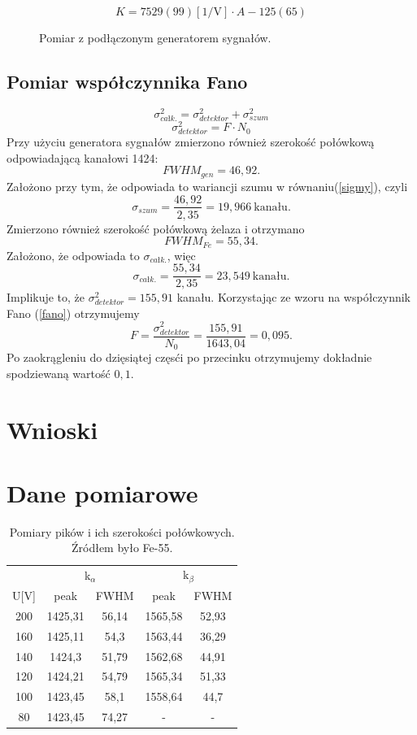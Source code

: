 \documentclass[11pt,a4paper]{article}
\begin{document}
\begin{equation}
	K = 7529(99)[\text{1/V}] \cdot A -125(65)
	\label{fit_gen}
\end{equation}
\begin{figure}[H]
\centering
\resizebox{.8\linewidth}{!}{}
\caption{Pomiar z podłączonym generatorem sygnałów.}
\label{fig1}
\end{figure}

\subsection{Pomiar współczynnika Fano}
\begin{equation}
	\sigma_{całk.}^2 = \sigma_{detektor}^2 + \sigma_{szum}^2
	\label{sigmy}
\end{equation}
\begin{equation}
	\sigma_{detektor}^2 = F\cdot N_0
	\label{fano}
\end{equation}
Przy użyciu generatora sygnałów zmierzono również szerokość połówkową odpowiadającą kanałowi 1424:
$$FWHM_{gen} = 46,92.$$
Założono przy tym, że odpowiada to wariancji szumu w równaniu(\ref{sigmy}), czyli
$$\sigma_{szum} = \frac{46,92}{2,35} = 19,966~ \text{kanału}. $$
Zmierzono również szerokość połówkową żelaza i otrzymano
$$FWHM_{Fe} = 55,34.$$
Założono, że odpowiada to $\sigma_{całk.}$, więc
$$\sigma_{całk.} = \frac{55,34}{2,35} = 23,549~ \text{kanału}.$$
Implikuje to, że $\sigma_{detektor}^2 = 155,91$ kanału.
Korzystając ze wzoru na współczynnik Fano (\ref{fano}) otrzymujemy
$$ F = \frac{\sigma_{detektor}^2}{N_0} = \frac{155,91}{1643,04} = 0,095.$$
Po zaokrągleniu do dzięsiątej częsći po przecinku otrzymujemy dokładnie spodziewaną wartość $0,1$.
\section{Wnioski}

\section{Dane pomiarowe}

\begin{longtable}{c|cc|cc}
	\caption{Pomiary pików i ich szerokości połówkowych. Źródłem było Fe-55.}\\
\label{dt2}
 &\multicolumn{2}{c|}{k$_{\alpha}$}	&\multicolumn{2}{c}{k$_{\beta}$} \\
U[V]	&peak	&FWHM	&peak	&FWHM\\ \hline
\endhead
200	&1425,31	&56,14	&1565,58	&52,93 \\
160	&1425,11	&54,3	&1563,44	&36,29 \\
140	&1424,3		&51,79	&1562,68	&44,91 \\
120	&1424,21	&54,79	&1565,34	&51,33 \\
100	&1423,45	&58,1	&1558,64	&44,7 \\
80	&1423,45	&74,27	&-	&- \\
\end{longtable}
\end{document}

